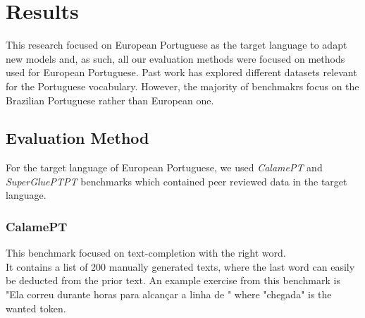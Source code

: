 
\chapter{Results}


\label{Section6}

This research focused on European Portuguese as the target language to adapt new models and, as such, all our evaluation methods
were focused on methods used for European Portuguese. Past work has explored  different datasets
relevant for the Portuguese vocabulary. However, the majority of benchmakrs focus on the Brazilian Portuguese rather than European one.


\section{Evaluation Method}
For the target language of European Portuguese, we used \textit{CalamePT} and \textit{SuperGluePTPT} 
benchmarks which contained peer reviewed data in the target language.

\subsection{CalamePT}
This benchmark focused on text-completion with the right word.\\
It contains a list of 200 manually generated texts, where the last word can easily be deducted from the prior text.
An example exercise from this benchmark is "Ela correu durante horas para alcançar a linha de " where "chegada" is the wanted
token.

